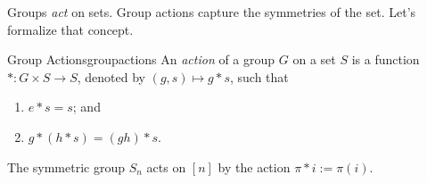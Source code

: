 Groups \emph{act} on sets. Group actions capture the symmetries of the set. Let's formalize that concept.

\begin{defn}{Group Actions}{groupactions}
  An \emph{action} of a group \(G\) on a set \(S\) is a function \(* \colon G \times S \to S\), denoted by \((g, s) \mapsto g * s\), such that
  \begin{enumerate}
    \item \(e * s = s\); and
    \item \(g * (h * s) = (gh) * s\).
  \end{enumerate}
\end{defn}

\begin{exmp}{}{}
  The symmetric group \(S_n\) acts on \([n]\) by the action \(\pi * i := \pi(i)\).
\end{exmp}
